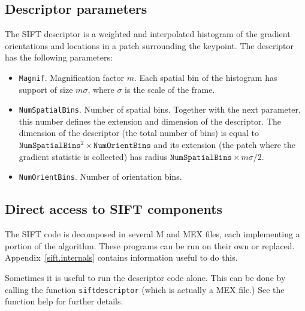 \documentclass{article}
\let\oldtt=\tt
\renewcommand{\tt}{\oldtt\color{codecolor}}
\begin{document}
\subsection{Descriptor parameters}\label{sift.user.descriptor}

The SIFT descriptor is a weighted and interpolated histogram of the gradient orientations and locations in a patch surrounding the keypoint. The descriptor has the following parameters:
\begin{itemize}
\item {\tt Magnif}. Magnification factor $m$. Each spatial bin of the histogram has support of size $m \sigma$, where $\sigma$ is the scale of the frame.
\item {\tt NumSpatialBins}. Number of spatial bins. Together with the next parameter, this number defines the extension and dimension of the descriptor. The dimension of the descriptor (the total number of bins) is equal to
$\mathtt{NumSpatialBins}^2 \times \mathtt{NumOrientBins}$ and its extension (the patch where the gradient statistic is collected) has radius $\mathtt{NumSpatialBins} \times m\sigma/2$. 
\item {\tt NumOrientBins}. Number of orientation bins.
\end{itemize}

\subsection{Direct access to SIFT components}\label{sift.user.direct}

The SIFT code is decomposed in several M and MEX files, each implementing a portion of the algorithm. These programs can be run on their own or replaced. Appendix~\ref{sift.internals} contains information useful to do this.


\begin{example}
Sometimes it is useful to run the descriptor code alone.
This can be done by calling the function {\tt siftdescriptor} (which is actually a MEX file.) See the function help for further details.
\end{example}



\end{document}
